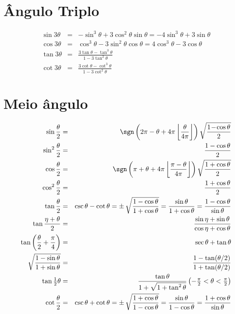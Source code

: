 \documentclass[
	article,			%
	12pt,				%
	twoside,			%
	a4paper,			%
	english,			%
	brazil,				%
	sumario=tradicional
	]{abntex2-modelo-notas-de-aula}
\begin{document}
\begin{apendicesenv}
\section{Ângulo Triplo}


\begin{eqnarray}
\sin 3\theta &=& - \sin^3\theta + 3 \cos^2\theta \sin\theta 
= - 4\sin^3\theta + 3\sin\theta  \\
\cos 3\theta  &=& \cos^3\theta - 3 \sin^2 \theta\cos \theta =
4 \cos^3\theta - 3 \cos\theta \\
\tan 3\theta &=& \frac{3 \tan\theta - \tan^3\theta}{1 - 3 \tan^2\theta}\\
\cot 3\theta &=& \frac{3 \cot\theta - \cot^3\theta}{1 - 3 \cot^2\theta}
\end{eqnarray}


\section{Meio ângulo}

\begin{eqnarray}
\sin \frac{\theta}{2} &=& \sgn \left(2 \pi - \theta + 4 \pi \left\lfloor \frac{\theta}{4\pi} \right\rfloor \right) \sqrt{\frac{1 \! - \! \cos \theta}{2}}\\
\sin^2\frac{\theta}{2} &=& \frac{1-\cos\theta}{2}\\
\cos \frac{\theta}{2} &=& \sgn \left(\pi + \theta + 4 \pi \left\lfloor \frac{\pi - \theta}{4\pi} \right\rfloor \right) \sqrt{\frac{1 + \cos\theta}{2}}\\
\cos^2\frac{\theta}{2} &=&\frac{1+\cos\theta}{2}\\
\tan \frac{\theta}{2} &=& \csc \theta - \cot \theta = \pm\, \sqrt{1 - \cos \theta \over 1 + \cos \theta} = \frac{\sin \theta}{1 + \cos \theta} = \frac{1-\cos \theta}{\sin \theta} \\
\tan\frac{\eta+\theta}{2} &=& \frac{\sin\eta+\sin\theta}{\cos\eta+\cos\theta} \\
\tan\left(\frac{\theta}{2} + \frac{\pi}{4}\right) &= &\sec\theta + \tan\theta \\
\sqrt{\frac{1 - \sin\theta}{1 + \sin\theta}}  &= &\frac{1 - \tan(\theta/2)}{1 + \tan(\theta/2)}\\
\tan\tfrac{1}{2}\theta  &=& \frac{\tan\theta}{1 + \sqrt{1+\tan^2\theta}} \left(-\tfrac{\pi}{2} < \theta < \tfrac{\pi}{2} \right)\\
\cot \frac{\theta}{2} & =& \csc \theta + \cot \theta = \pm\, \sqrt{1 + \cos \theta \over 1 - \cos \theta} = \frac{\sin \theta}{1 - \cos \theta} = \frac{1 + \cos \theta}{\sin \theta} 
\end{eqnarray}



\end{apendicesenv}
\end{document}
